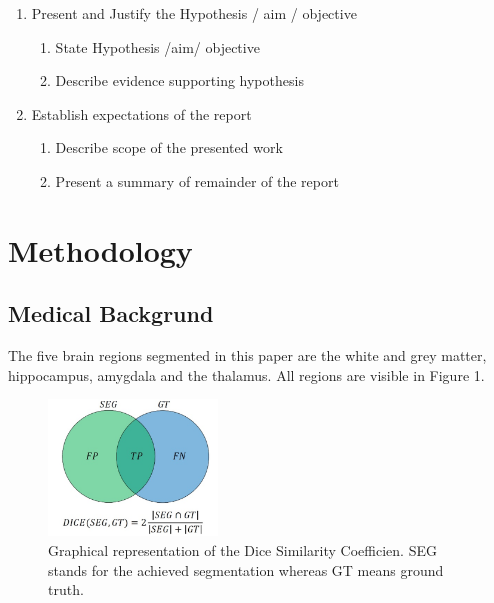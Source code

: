 \documentclass[journal]{IEEEtran}
\begin{document}
{\begin{enumerate}
\begin{enumerate}
	\end{enumerate}
\item Present and Justify the Hypothesis / aim / objective
	\begin{enumerate}
	\item State Hypothesis /aim/ objective
	\item Describe evidence supporting hypothesis
	\end{enumerate}
\item Establish expectations of the report
	\begin{enumerate}
	\item Describe scope of the presented work
	\item Present a summary of remainder of the report\\
	\end{enumerate}
\end{enumerate} 
}




\section{Methodology}
\subsection{Medical Backgrund}
	The five brain regions segmented in this paper are the white and grey matter, hippocampus, amygdala and the thalamus. All regions are visible in Figure 1.

	\begin{figure}[h]
		\centering
		\includegraphics[width=0.4\textwidth]{diceGraphics.png}
		\caption{Graphical representation of the Dice Similarity Coefficien. SEG stands for the achieved segmentation whereas GT means ground truth.}
		\label{fig:e8}
	\end{figure}
\end{document}
